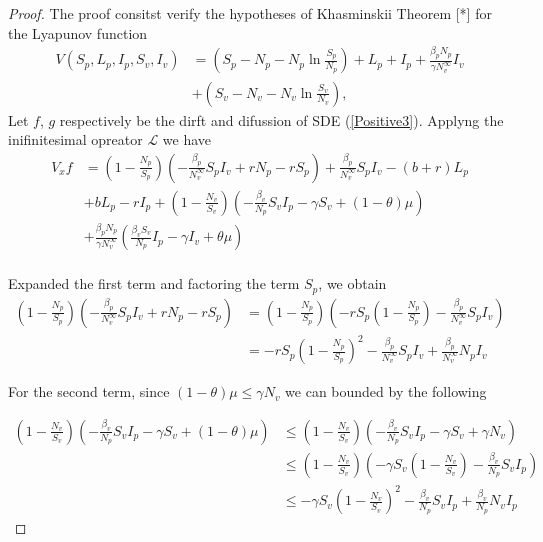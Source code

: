 \begin{proof}
	The proof consitst verify the hypotheses of Khasminskii Theorem [*] for 
	the Lyapunov function
	\begin{align*}
		V(S_p,L_p,I_p,S_v,I_v) 
			&= 
				\left(S_p-N_p-N_p\ln\frac{S_p}{N_p}\right)+L_p+I_p+\frac{\beta_p N_p}{\gamma N^\infty_v}I_v\\
			&+
				\left(S_v-N_v-N_v\ln\frac{S_v}{N_v}\right),
	\end{align*}
	Let $f$, $g$ respectively be the dirft and difussion of SDE 
	(\ref{Positive3}).	
	Applyng the inifinitesimal opreator $\mathcal{L}$ we have
	\begin{align}
	V_x f 
		&=
			\left(1-\frac{N_p}{S_p}\right)\left(-\frac{\beta_p}{N^\infty_v}S_pI_v +rN_p-r S_p\right)+\frac{\beta_p}{N^\infty_v}S_pI_v-(b+r)L_p\\
		&+
			bL_p-rI_p+\left(1-\frac{N_v}{S_v}\right)\left(-\frac{\beta_v}{N_p}S_vI_p -\gamma S_v +(1-\theta)\mu\right)\\
		&+
			\frac{\beta_p N_p}{\gamma N^\infty_v}\left(\frac{\beta_v S_v}{N_p}I_p-\gamma I_v+\theta\mu\right)\\
	\end{align}
	
	Expanded the first term and factoring the term $S_p$, we obtain
	\begin{equation}\label{theorem2term1}
		\begin{aligned}
			\left(1-\frac{N_p}{S_p}\right)\left(-\frac{\beta_p}{N^\infty_v}S_pI_v +rN_p-r S_p\right) 
				&=
					\left(1-\frac{N_p}{S_p}\right)\left(- r S_p \left(1-\frac{N_p}{S_p}\right)-\frac{\beta_p}{N^\infty_v}S_pI_v\right)\\
				&=
					- r S_p \left(1-\frac{N_p}{S_p}\right)^2-\frac{\beta_p}{N^\infty_v}S_pI_v + \frac{\beta_p}{N^\infty_v}N_pI_v
		\end{aligned}
	\end{equation}
	
	
	For the second term, since $(1-\theta)\mu\leq \gamma N_v$ we can bounded by the following
	
	\begin{equation}\label{theorem2term2}
		\begin{aligned}
			\left(1-\frac{N_v}{S_v}\right)\left(-\frac{\beta_v}{N_p}S_vI_p -\gamma S_v +(1-\theta)\mu\right) 
			&\leq
				\left(1-\frac{N_v}{S_v}\right)\left(-\frac{\beta_v}{N_p}S_vI_p -\gamma S_v +\gamma N_v\right)\\
			&\leq
				\left(1-\frac{N_v}{S_v}\right)\left(-\gamma S_v\left(1-\frac{N_v}{S_v}\right)-\frac{\beta_v}{N_p}S_vI_p\right)\\
			&\leq
				-\gamma S_v\left(1-\frac{N_v}{S_v}\right)^2-\frac{\beta_v}{N_p}S_vI_p+\frac{\beta_v}{N_p}N_vI_p
		\end{aligned}
	\end{equation}
	

\end{proof}
